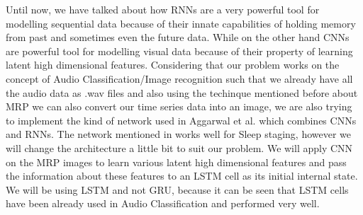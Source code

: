 \documentclass[letterpaper, 10 pt, conference]{ieeeconf}  %
\begin{document}
Until now, we have talked about how RNNs are a very powerful tool for modelling sequential data because of their innate capabilities of holding memory from past and sometimes even the future data. While on the other hand CNNs are powerful tool for modelling visual data because of their property of learning latent high dimensional features. Considering that our problem works on the concept of Audio Classification/Image recognition such that we already have all the audio data as .wav files and also using the techinque mentioned before about MRP we can also convert our time series data into an image, we are also trying to implement the kind of network used in Aggarwal et al. \cite{cnn_rnn_sleep_staging}
which combines CNNs and RNNs. The network mentioned in \cite{cnn_rnn_sleep_staging} works well for Sleep staging, however we will change the architecture a little bit to suit our problem. We will apply CNN on the MRP images to learn various latent high dimensional features and pass the information about these features to an LSTM cell as its initial internal state. We will be using LSTM and not GRU, because it can be seen that LSTM cells have been already used in Audio Classification \cite{lstm_music_genre} and performed very well.
\end{document}
